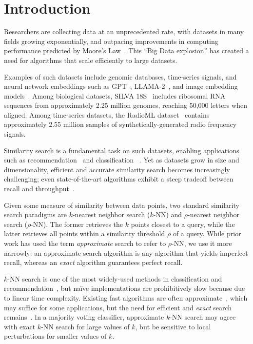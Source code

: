 \section{Introduction}
\label{sec:introduction}

Researchers are collecting data at an unprecedented rate, with datasets in many fields growing exponentially, and outpacing improvements in computing performance predicted by Moore's Law~\cite{kahn2011future}. This ``Big Data explosion'' has created a need for algorithms that scale efficiently to large datasets.

Examples of such datasets include genomic databases, time-series signals, and neural network embeddings such as GPT~\cite{2020arXiv200514165B, OpenAI2023GPT4TR}, LLAMA-2~\cite{Touvron2023Llama2O}, and image embedding models~\cite{radford2021learning, dosovitskiy2020image}.
Among biological datasets,  SILVA 18S~\cite{10.1093/nar/gks1219} includes ribosomal RNA sequences from approximately 2.25 million genomes, reaching 50,000 letters when aligned.
Among time-series datasets, the RadioML dataset~\cite{oshea2018radioml} contains approximately 2.55 million samples of synthetically-generated radio frequency signals.

Similarity search is a fundamental task on such datasets, enabling applications such as recommendation~\cite{annoy} and classification ~\cite{suyanto2022knnclassifier}.
Yet as datasets grow in size and dimensionality, efficient and accurate similarity search becomes increasingly challenging;
even state-of-the-art algorithms exhibit a steep tradeoff between recall and throughput~\cite{malkov2016hnsw, johnson2019billion, annoy, aumuller2020ann}.

Given some measure of similarity between data points, two standard similarity search paradigms are $k$-nearest neighbor search ($k$-NN) and $\rho$-nearest neighbor search ($\rho$-NN).
The former retrieves the $k$ points closest to a query, while the latter retrieves all points within a similarity threshold $\rho$ of a query.
While prior work has used the term \textit{approximate} search to refer to $\rho$-NN, we use it more narrowly: an {approximate} search algorithm is any algorithm that yields imperfect recall, whereas an \textit{exact} algorithm guarantees perfect recall.

$k$-NN search is one of the most widely-used methods in classification and recommendation~\cite{fix1952discriminatory, cover1967nearest}, but na\"{i}ve implementations are prohibitively slow because due to linear time complexity.
Existing fast algorithms are often approximate~\cite{gao2023high}, which may suffice for some applications, but the need for efficient and \textit{exact} search remains~\cite{ukey2023survey}.
In a majority voting classifier, approximate $k$-NN search may agree with exact $k$-NN search for large values of $k$, but be sensitive to local perturbations for smaller values of $k$.

